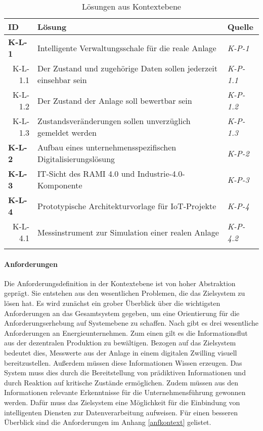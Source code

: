 \begin{table}[H]
  \begin{tabularx}{\textwidth}{@{}lXp{2cm}@{}}
      \toprule
      ID                & Lösung & Quelle \\
      \midrule
      \textbf{K-L-1}              &   Intelligente Verwaltungsschale für die reale Anlage & \textit{K-P-1}                \\
      \multicolumn{1}{r}{K-L-1.1} &  Der Zustand und zugehörige Daten sollen jederzeit einsehbar sein & \textit{K-P-1.1}\\
      \multicolumn{1}{r}{K-L-1.2} & Der Zustand der Anlage soll bewertbar sein & \textit{K-P-1.2}\\
      \multicolumn{1}{r}{K-L-1.3} & Zustandsveränderungen sollen unverzüglich gemeldet werden & \textit{K-P-1.3}\\
      \textbf{K-L-2}              & Aufbau eines unternehmensspezifischen Digitalisierungslösung    & \textit{K-P-2}                \\
      \textbf{K-L-3}              & IT-Sicht des RAMI 4.0 und Industrie-4.0-Komponente           & \textit{K-P-3}                \\
      \textbf{K-L-4}              &  Prototypische Architekturvorlage für IoT-Projekte & \textit{K-P-4} \\
      \multicolumn{1}{r}{K-L-4.1} &  Messinstrument zur Simulation einer realen Anlage & \textit{K-P-4.2}\\
      \addlinespace
      \bottomrule
  \end{tabularx}
  \label{kontext_losung}
  \caption{Lösungen aus Kontextebene}
\end{table}

\paragraph{Anforderungen}

Die Anforderungsdefinition in der Kontextebene ist von hoher Abstraktion geprägt. Sie entstehen aus den wesentlichen Problemen, die das Zielsystem zu lösen hat. Es wird zunächst ein grober Überblick über die wichtigsten Anforderungen an das Gesamtsystem gegeben, um eine Orientierung für die Anforderungserhebung auf Systemebene zu schaffen. Nach \citet{Doleski2016} gibt es drei wesentliche Anforderungen an Energieunternehmen. Zum einen gilt es die Informationsflut aus der dezentralen Produktion zu bewältigen. Bezogen auf das Zielsystem bedeutet dies, Messwerte aus der Anlage in einem digitalen Zwilling visuell bereitzustellen. Außerdem müssen diese Informationen Wissen erzeugen. Das System muss dies durch die Bereitstellung von prädiktiven Informationen und durch Reaktion auf kritische Zustände ermöglichen. Zudem müssen aus den Informationen relevante Erkenntnisse für die Unternehmensführung gewonnen werden. Dafür muss das Zielsystem eine Möglichkeit für die Einbindung von intelligenten Diensten zur Datenverarbeitung aufweisen. Für einen besseren Überblick sind die Anforderungen im Anhang  \ref{anfkontext} gelistet.


